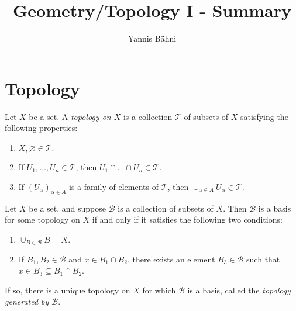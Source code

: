


\title{Geometry/Topology I - Summary}
\author{Yannis B\"{a}hni}
\address[Yannis B\"{a}hni]{University of Zurich, R\"{a}mistrasse 71, 8006 Zurich}

\maketitle
\thispagestyle{fancy}


\originalsectionstyle

\section{Topology}
\begin{definition}
	Let $X$ be a set. A \emph{topology on $X$} is a collection $\mathcal{T}$ of subsets of $X$ satisfying the following properties:
	
	\begin{enumerate}[label = (\roman*)]
		\item $X,\varnothing \in \mathcal{T}$.
		\item If $U_1,\dots,U_n \in \mathcal{T}$, then $U_1 \cap \dots \cap U_n \in \mathcal{T}$.
		\item If $(U_\alpha)_{\alpha \in A}$ is a family of elements of $\mathcal{T}$, then $\cup_{\alpha \in A} U_\alpha \in \mathcal{T}$.
	\end{enumerate}
\end{definition}

\vspace{1mm}

\begin{definition}
	Let $X$ be a set, and suppose $\mathcal{B}$ is a collection of subsets of $X$. Then $\mathcal{B}$ is a basis for some topology on $X$ if and only if it satisfies the following two conditions:
	\begin{enumerate}[label = (\roman*)]
		\item $\cup_{B \in \mathcal{B}} B = X$.
		\item If $B_1, B_2 \in \mathcal{B}$ and $x \in B_1 \cap B_2$, there exists an element $B_3 \in \mathcal{B}$ such that $x \in B_3 \subseteq B_1 \cap B_2$. 
	\end{enumerate}

	If so, there is a unique topology on $X$ for which $\mathcal{B}$ is a basis, called the \emph{topology generated by $\mathcal{B}$}.
\end{definition}

